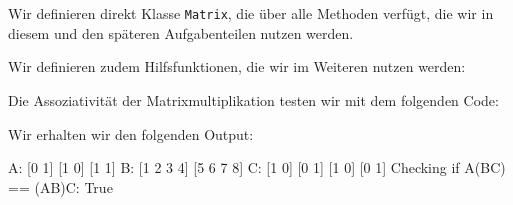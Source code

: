 \section{}

Wir definieren direkt Klasse \texttt{Matrix}, die über alle Methoden verfügt, die wir in diesem und den späteren Aufgabenteilen nutzen werden.



Wir definieren zudem Hilfsfunktionen, die wir im Weiteren nutzen werden:



Die Assoziativität der Matrixmultiplikation testen wir mit dem folgenden Code:



Wir erhalten wir den folgenden Output:

\begin{consoleoutput}
A:
[0 1]
[1 0]
[1 1]
B:
[1 2 3 4]
[5 6 7 8]
C:
[1 0]
[0 1]
[1 0]
[0 1]
Checking if A(BC) == (AB)C:
True
\end{consoleoutput}



